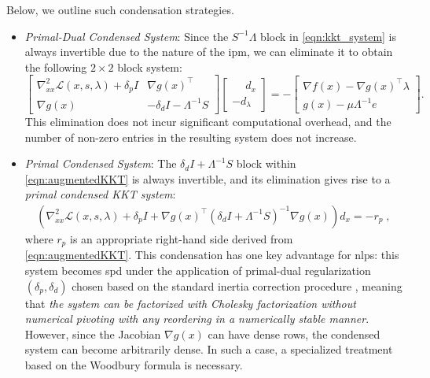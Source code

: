 \documentclass{article}
\begin{document}
Below, we outline such condensation strategies.
\begin{itemize}[leftmargin=*,itemsep=0pt,parsep=0pt,partopsep=0pt]
\item \textit{Primal-Dual Condensed System}:
Since the \(S^{-1}\Lambda\) block in \cref{eqn:kkt_system} is always invertible due to the nature of the \gls*{ipm}, we can eliminate it to obtain the following \(2 \times 2\) block system:
\begin{equation}\label{eqn:augmentedKKT}
  \begin{bmatrix}
    \nabla^2_{xx} \mathcal{L}(x,s,\lambda) + \delta_p I & \nabla g(x)^\top \\
    \nabla g(x) &  - \delta_d I - \Lambda^{-1} S
  \end{bmatrix}
  \begin{bmatrix}
    \phantom{-}d_x\\
    - d_\lambda
  \end{bmatrix} =
  -\begin{bmatrix}
    \nabla f(x) - \nabla g(x)^\top \lambda\\
    g(x) - \mu \Lambda^{-1} e
  \end{bmatrix}.
\end{equation}
This elimination does not incur significant computational overhead, and the number of non-zero entries in the resulting system does not increase.

\item \textit{Primal Condensed System}:
The $\delta_d I + \Lambda^{-1}S$ block within \eqref{eqn:augmentedKKT} is always invertible, and its elimination gives rise to a \emph{primal condensed KKT system}:
\begin{align}\label{eqn:kkt_primal}
  \left(\nabla^2_{x x} \mathcal{L}(x,s,\lambda) + \delta_p I + \nabla g(x)^\top (\delta_d I + \Lambda^{-1} S)^{-1} \nabla g(x) \right) d_x = - r_p \; ,
\end{align}
where $r_p$ is an appropriate right-hand side derived from \eqref{eqn:augmentedKKT}.
This condensation has one key advantage for \glspl*{nlp}: this system becomes \gls*{spd} under the application of primal-dual regularization $(\delta_p, \delta_d)$ chosen based on the standard inertia correction procedure \cite{shinAcceleratingOptimalPower2024}, meaning that \emph{the system can be factorized with Cholesky factorization without numerical pivoting with any reordering in a numerically stable manner}.
However, since the Jacobian $\nabla g(x)$ can have dense rows, the condensed system can become arbitrarily dense. In such a case, a specialized treatment based on the Woodbury formula is necessary.



\end{itemize}
\end{document}
